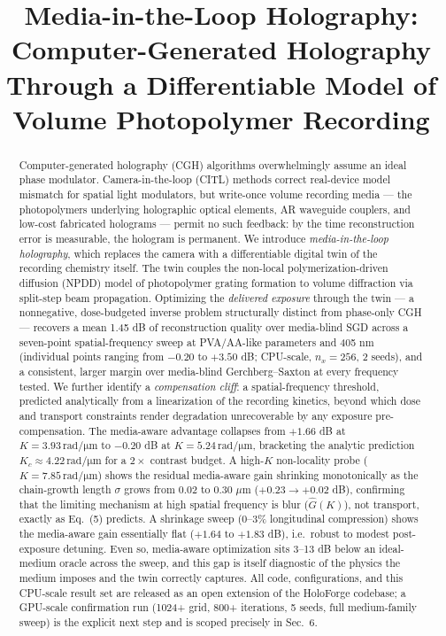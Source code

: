 \documentclass[conference]{IEEEtran}
\title{Media-in-the-Loop Holography: Computer-Generated Holography\\Through a Differentiable Model of Volume Photopolymer Recording}
\author{
  \IEEEauthorblockN{Chaitanya Tripathi}
  \IEEEauthorblockA{Ashoka University\\
  Sonipat, India}
  \and
  \IEEEauthorblockN{[Co-author]}
  \IEEEauthorblockA{BITS Pilani\\
  India}
}
\begin{document}
\maketitle

\begin{abstract}
Computer-generated holography (CGH) algorithms overwhelmingly assume an ideal
phase modulator. Camera-in-the-loop (CITL) methods correct real-device model
mismatch for spatial light modulators, but write-once volume recording media
— the photopolymers underlying holographic optical elements, AR waveguide
couplers, and low-cost fabricated holograms — permit no such feedback: by the
time reconstruction error is measurable, the hologram is permanent. We
introduce \emph{media-in-the-loop holography}, which replaces the camera with
a differentiable digital twin of the recording chemistry itself. The twin
couples the non-local polymerization-driven diffusion (NPDD) model of
photopolymer grating formation to volume diffraction via split-step beam
propagation. Optimizing the \emph{delivered exposure} through the twin — a
nonnegative, dose-budgeted inverse problem structurally distinct from
phase-only CGH — recovers a mean 1.45 dB of reconstruction quality over
media-blind SGD across a seven-point spatial-frequency sweep at PVA/AA-like
parameters and 405 nm (individual points ranging from $-0.20$ to $+3.50$ dB;
CPU-scale, $n_x{=}256$, 2 seeds), and a consistent, larger margin over
media-blind Gerchberg--Saxton at every frequency tested. We further identify a
\emph{compensation cliff}: a spatial-frequency threshold, predicted
analytically from a linearization of the recording kinetics, beyond which
dose and transport constraints render degradation unrecoverable by any
exposure pre-compensation. The media-aware advantage collapses from
$+1.66$ dB at $K = 3.93\,\mathrm{rad/\mu m}$ to $-0.20$ dB at
$K = 5.24\,\mathrm{rad/\mu m}$, bracketing the analytic prediction
$K_c \approx 4.22\,\mathrm{rad/\mu m}$ for a $2\times$ contrast budget. A
high-$K$ non-locality probe ($K = 7.85\,\mathrm{rad/\mu m}$) shows the
residual media-aware gain shrinking monotonically as the chain-growth length
$\sigma$ grows from 0.02 to 0.30 $\mu$m ($+0.23 \rightarrow +0.02$ dB),
confirming that the limiting mechanism at high spatial frequency is
blur ($\hat G(K)$), not transport, exactly as Eq.~(5) predicts. A shrinkage
sweep (0--3\% longitudinal compression) shows the media-aware gain essentially
flat ($+1.64$ to $+1.83$ dB), i.e.\ robust to modest post-exposure detuning.
Even so, media-aware optimization sits 3--13 dB below an ideal-medium oracle
across the sweep, and this gap is itself diagnostic of the physics the medium
imposes and the twin correctly captures. All code, configurations, and this
CPU-scale result set are released as an open extension of the HoloForge
codebase; a GPU-scale confirmation run (1024+ grid, 800+ iterations, 5 seeds,
full medium-family sweep) is the explicit next step and is scoped precisely
in Sec.~6.
\end{abstract}
\end{document}
